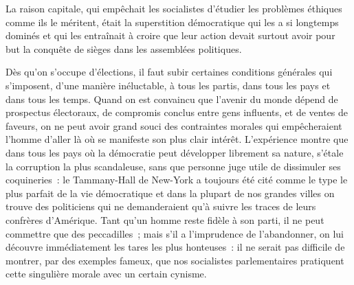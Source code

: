\documentclass[french,twoside]{book} %
\begin{document}
La raison capitale, qui empêchait les socialistes d’étudier les problèmes éthiques comme ils le méritent, était la superstition démocratique qui les a si longtemps dominés et qui les entraînait à croire que leur action devait surtout avoir pour but la conquête de sièges dans les assemblées politiques.\par
Dès qu’on s’occupe d’élections, il faut subir certaines conditions générales qui s’imposent, d’une manière inéluctable, à tous les partis, dans tous les pays et dans tous les temps. Quand on est convaincu que l’avenir du monde dépend de prospectus électoraux, de compromis  conclus entre gens influents, et de ventes de faveurs, on ne peut avoir grand souci des contraintes morales qui empêcheraient l’homme d’aller là où se manifeste son plus clair intérêt. L’expérience montre que dans tous les pays où la démocratie peut développer librement sa nature, s’étale la corruption la plus scandaleuse, sans que personne juge utile de dissimuler ses coquineries : le Tammany-Hall de New-York a toujours été cité comme le type le plus parfait de la vie démocratique et dans la plupart de nos grandes villes on trouve des politiciens qui ne demanderaient qu’à suivre les traces de leurs confrères d’Amérique. Tant qu’un homme reste fidèle à son parti, il ne peut commettre que des peccadilles ; mais s’il a l’imprudence de l’abandonner, on lui découvre immédiatement les tares les plus honteuses : il ne serait pas difficile de montrer, par des exemples fameux, que nos socialistes parlementaires pratiquent cette singulière morale avec un certain cynisme.\par
\end{document}
